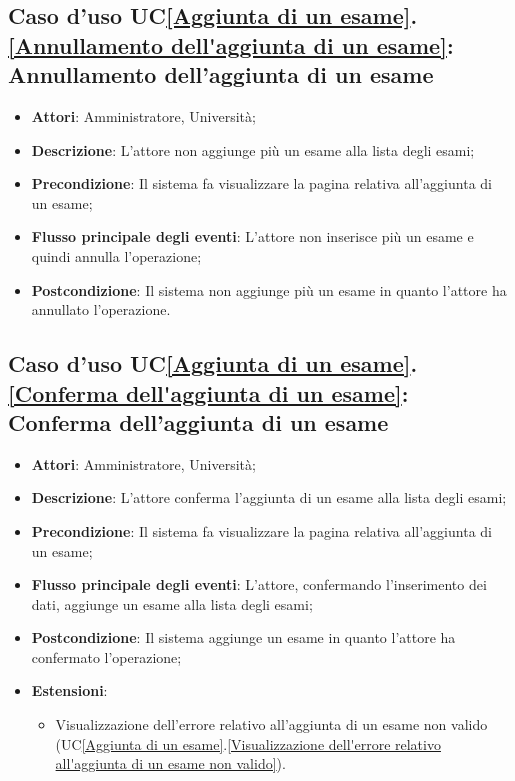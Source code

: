 \subsection{Caso d'uso UC\ref{Aggiunta di un esame}.\ref{Annullamento dell'aggiunta di un esame}: Annullamento dell'aggiunta di un esame}
\begin{itemize}
	\item \textbf{Attori}: Amministratore, Università;
	\item \textbf{Descrizione}: L'attore non aggiunge più un esame alla lista degli esami;
	
	\item \textbf{Precondizione}: Il sistema fa visualizzare la pagina relativa all'aggiunta di un esame;
	
	\item \textbf{Flusso principale degli eventi}: L'attore non inserisce più un esame e quindi annulla l'operazione;
	
	\item \textbf{Postcondizione}: Il sistema non aggiunge più un esame in quanto l'attore ha annullato l'operazione.
\end{itemize}

\subsection{Caso d'uso UC\ref{Aggiunta di un esame}.\ref{Conferma dell'aggiunta di un esame}: Conferma dell'aggiunta di un esame}
\begin{itemize}
	\item \textbf{Attori}: Amministratore, Università;
	\item \textbf{Descrizione}: L'attore conferma l'aggiunta di un esame alla lista degli esami;
	
	\item \textbf{Precondizione}: Il sistema fa visualizzare la pagina relativa all'aggiunta di un esame;
	
	\item \textbf{Flusso principale degli eventi}: L'attore, confermando l'inserimento dei dati, aggiunge un esame alla lista degli esami;
	
	\item \textbf{Postcondizione}: Il sistema aggiunge un esame in quanto l'attore ha confermato l'operazione;
	
	\item \textbf{Estensioni}:
	\begin{itemize}
		\item Visualizzazione dell'errore relativo all'aggiunta di un esame non valido (UC\ref{Aggiunta di un esame}.\ref{Visualizzazione dell'errore relativo all'aggiunta di un esame non valido}).
	\end{itemize}
\end{itemize}

